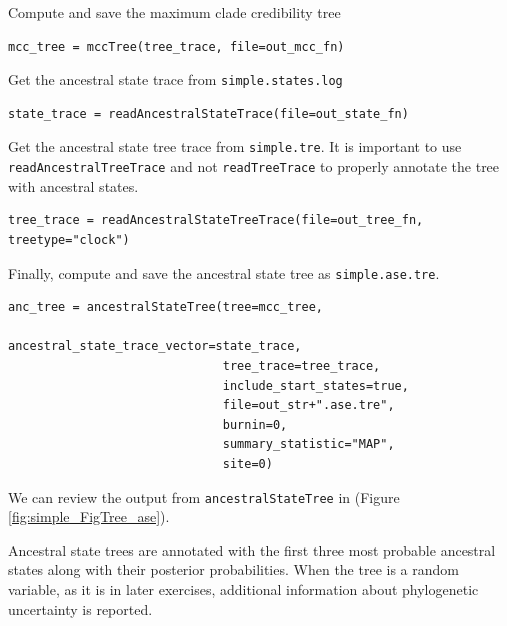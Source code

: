 Compute and save the maximum clade credibility tree
\begin{snugshade}
\begin{lstlisting}
mcc_tree = mccTree(tree_trace, file=out_mcc_fn)
\end{lstlisting}
\end{snugshade}

Get the ancestral state trace from {\tt simple.states.log}

\begin{snugshade}
\begin{lstlisting}
state_trace = readAncestralStateTrace(file=out_state_fn)
\end{lstlisting}
\end{snugshade}


Get the ancestral state tree trace from {\tt simple.tre}.
It is important to use {\tt readAncestralTreeTrace} and not {\tt readTreeTrace} to properly annotate the tree with ancestral states.

\begin{snugshade}
\begin{lstlisting}
tree_trace = readAncestralStateTreeTrace(file=out_tree_fn, treetype="clock")
\end{lstlisting}
\end{snugshade}

Finally, compute and save the ancestral state tree as {\tt simple.ase.tre}.

\begin{snugshade}
\begin{lstlisting}
anc_tree = ancestralStateTree(tree=mcc_tree,
                              ancestral_state_trace_vector=state_trace,
                              tree_trace=tree_trace,
                              include_start_states=true,
                              file=out_str+".ase.tre",
                              burnin=0,
                              summary_statistic="MAP",
                              site=0)
\end{lstlisting}
\end{snugshade}

We can review the output from {\tt ancestralStateTree} in \FigTree (Figure \ref{fig:simple_FigTree_ase}).

Ancestral state trees are annotated with the first three most probable ancestral states along with their posterior probabilities.
When the tree is a random variable, as it is in later exercises, additional information about phylogenetic uncertainty is reported.

